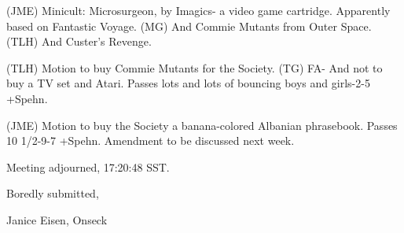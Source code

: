 \documentclass[12pt]{article}
\begin{document}
(JME) Minicult: Microsurgeon, by Imagics- a video game cartridge. Apparently based on Fantastic Voyage. (MG) And Commie Mutants from Outer Space. (TLH) And Custer's Revenge.

(TLH) Motion to buy Commie Mutants for the Society. (TG) FA- And not to buy a TV set and Atari. Passes lots and lots of bouncing boys and girls-2-5 +Spehn.

(JME) Motion to buy the Society a banana-colored Albanian phrasebook. Passes 10 1/2-9-7 +Spehn. Amendment to be discussed next week.

\vspace{12pt}

\noindent
Meeting adjourned, 17:20:48 SST.

\vspace{18pt}

\centerline{Boredly submitted,}
\centerline{Janice Eisen, Onseck}
\end{document}
